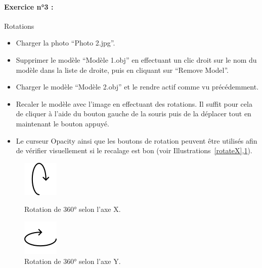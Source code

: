 \documentclass[12pt]{report}
\begin{document}
\begin{appendices}
\paragraph{Exercice n°3 :}Rotations
\begin{itemize}
\item Charger la photo ``Photo 2.jpg''.
\item Supprimer le modèle ``Modèle 1.obj'' en effectuant un clic droit sur le nom du modèle dans la liste de droite, puis en cliquant sur ``Remove Model''.
\item Charger le modèle ``Modèle 2.obj'' et le rendre actif comme vu précédemment.
\item Recaler le modèle avec l'image en effectuant des rotations. Il suffit pour cela de cliquer à l'aide du bouton gauche de la souris puis de la déplacer tout en maintenant le bouton appuyé.
\item Le curseur Opacity ainsi que les boutons de rotation peuvent être utilisés afin de vérifier visuellement si le recalage est bon (voir Illustrations~\ref{rotateX},\ref{rotateY}).
\end{itemize}
						

\begin{figure}[H]
\centerline{\includegraphics[scale = 1]{img/icons/rotateX.png}}
\caption{Rotation de 360° selon l'axe X.}
\label{rotateX}
\endminipage\hfill
{}
\centerline{\includegraphics[scale = 1]{img/icons/rotateY.png}}
\caption{Rotation de 360° selon l'axe Y.}
\label{rotateY}
\endminipage
\end{figure}


\end{appendices}
\end{document}
